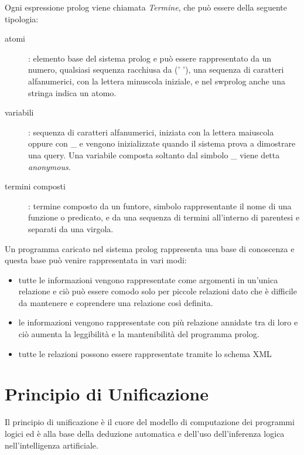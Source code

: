 \documentclass[a4paper]{report}
\begin{document}
Ogni espressione prolog viene chiamata \emph{Termine}, che può essere della seguente tipologia:
\begin{description}
\item [atomi] : elemento base del sistema prolog e può essere rappresentato da un numero, qualsiasi sequenza racchiusa da (' '),
  una sequenza di caratteri alfanumerici, con la lettera minuscola iniziale, e nel swprolog anche una stringa indica un atomo.

\item [variabili] : sequenza di caratteri alfanumerici, iniziata con la lettera maiuscola oppure con \_ e vengono inizializzate
  quando il sistema prova a dimostrare una query.\newline
                    Una variabile composta soltanto dal simbolo \_ viene detta \emph{anonymous}.

\item [termini composti]: termine composto da un funtore, simbolo rappresentante il nome di una funzione o predicato, e da una sequenza
                          di termini all'interno di parentesi e separati da una virgola.                    
\end{description}

Un programma caricato nel sistema prolog rappresenta una base di conoscenza e questa base può venire rappresentata in vari modi:
\begin{itemize}
\item tutte le informazioni vengono rappresentate come argomenti in un'unica relazione e ciò può essere comodo solo per
  piccole relazioni dato che è difficile da mantenere e coprendere una relazione così definita.
\item le informazioni vengono rappresentate con più relazione annidate tra di loro e ciò aumenta la leggibilità e
  la mantenibilità del programma prolog.
\item tutte le relazioni possono essere rappresentate tramite lo schema XML
\end{itemize}

\section{Principio di Unificazione}
Il principio di unificazione è il cuore del modello di computazione dei programmi logici ed è alla base della deduzione automatica
e dell'uso dell'inferenza logica nell'intelligenza artificiale.
\end{document}

